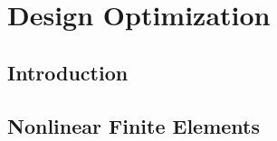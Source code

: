 \chapter[Design Optimization]{Design Optimization}
\label{chap: chapter 1}




\section{Introduction} \label{sec: chap1 1_introduction}


\section{Nonlinear Finite Elements} \label{sec: chap1 1_introduction}

